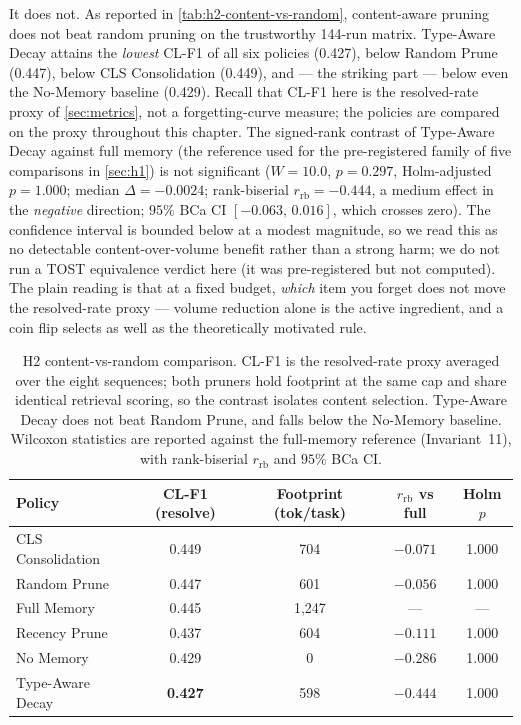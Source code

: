 It does not. As reported in \autoref{tab:h2-content-vs-random}, content-aware pruning does
not beat random pruning on the trustworthy 144-run matrix. Type-Aware Decay attains the
\emph{lowest} CL-F1 of all six policies (0.427), below Random Prune (0.447), below CLS
Consolidation (0.449), and --- the striking part --- below even the No-Memory baseline
(0.429). Recall that CL-F1 here is the resolved-rate proxy of \autoref{sec:metrics}, not a
forgetting-curve measure; the policies are compared on the proxy throughout this chapter.
The signed-rank contrast of Type-Aware Decay against full memory (the reference used for
the pre-registered family of five comparisons in \autoref{sec:h1}) is not significant
($W=10.0$, $p=0.297$, Holm-adjusted $p=1.000$; median $\Delta=-0.0024$; rank-biserial
$r_{\mathrm{rb}}=-0.444$, a medium effect in the \emph{negative} direction; $95\%$ BCa CI
$[-0.063,\,0.016]$, which crosses zero). The confidence interval is bounded below at a
modest magnitude, so we read this as no detectable content-over-volume benefit rather than
a strong harm; we do not run a TOST equivalence verdict here (it was pre-registered but not
computed). The plain reading is that at a fixed budget, \emph{which} item you forget does
not move the resolved-rate proxy --- volume reduction alone is the active ingredient, and a
coin flip selects as well as the theoretically motivated rule.

\begin{table}[htbp]
\centering
\caption{H2 content-vs-random comparison. CL-F1 is the resolved-rate proxy averaged over
the eight sequences; both pruners hold footprint at the same cap and share identical
retrieval scoring, so the contrast isolates content selection. Type-Aware Decay does not
beat Random Prune, and falls below the No-Memory baseline. Wilcoxon statistics are reported
against the full-memory reference (Invariant~11), with rank-biserial $r_{\mathrm{rb}}$ and
$95\%$ BCa CI.}
\label{tab:h2-content-vs-random}
\begin{tabular}{lcccc}
\toprule
Policy & CL-F1 (resolve) & Footprint (tok/task) & $r_{\mathrm{rb}}$ vs full & Holm $p$ \\
\midrule
CLS Consolidation & 0.449 & 704 & $-0.071$ & 1.000 \\
Random Prune      & 0.447 & 601 & $-0.056$ & 1.000 \\
Full Memory       & 0.445 & 1{,}247 & --- & --- \\
Recency Prune     & 0.437 & 604 & $-0.111$ & 1.000 \\
No Memory         & 0.429 & 0 & $-0.286$ & 1.000 \\
Type-Aware Decay  & \textbf{0.427} & 598 & $-0.444$ & 1.000 \\
\bottomrule
\end{tabular}
\end{table}

